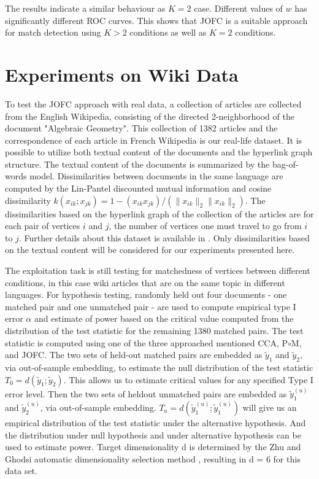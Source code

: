 \documentclass[12pt,oneside,final]{thesis}
\begin{document}
The results indicate a similar behaviour as $K=2$ case. Different  values of $w$ has significantly different ROC curves. This shows that JOFC is a suitable approach for match detection using $K>2$ conditions as well as $K=2$ conditions.


\section{Experiments on Wiki Data}
To test the JOFC approach with real data, a collection of articles are collected from the English Wikipedia, consisting of the
 directed 2-neighborhood of the document "Algebraic Geometry". 
   This  collection of 1382 articles and the correspondence of each article in French 
Wikipedia is our real-life dataset. It is possible to utilize both textual content of the documents and the hyperlink graph structure. The textual content of the documents is summarized by the bag-of-words model. Dissimilarities between documents  in the same language are computed by the Lin-Pantel discounted mutual information \cite{LinPantel,PantelLin}
 and cosine dissimilarity $k(x_{ik}; x_{jk}) = 1 - (x_{ik} x_{jk})/(\|x_{ik}\|_2\|x_{ik}\|_2)$. 
 The dissimilarities based on the hyperlink graph of the collection of the articles are 
 for each pair of vertices $i$ and $j$, the number of vertices one must travel to go from $i$ to $j$.  Further details about this dataset is available in \cite{Zhiliang_disparate}.     
Only  dissimilarities based on the textual content will be considered for our experiments presented here.
   
The exploitation task is still testing for matchedness of vertices between different conditions, in this case wiki articles that are on the same topic  in  different languages.
For hypothesis testing,   randomly held out four documents - one matched pair and one unmatched pair
 -  are used to compute empirical type I error $\alpha$ and estimate of power based on the critical value computed
  from the distribution of the test statistic for the remaining 1380 matched pairs. 
The test statistic is computed using one of the three approached mentioned  CCA, P$\circ$M, and JOFC. 
The two sets of held-out matched pairs are embedded as $\tilde{y}_1$ and $\tilde{y}_2$, via out-of-sample
embedding, to estimate the null distribution of the test statistic $T_0 = d(\tilde{y}_1; \tilde{y}_2)$. This allows
us to estimate critical values for any specified Type I error level. 
Then the two sets of heldout unmatched pairs are embedded as $\tilde{y}_1^{(u)}$ and $\tilde{y}_2^{(u)}$, via out-of-sample embedding. 
$T_{a} = d(\tilde{y}_1^{(u)}; \tilde{y}_1^{(u)})$ will give us an empirical distribution of the test statistic  under the alternative hypothesis. 
And the distribution under null hypothesis and under alternative hypothesis can be used to estimate power.
Target dimensionality d is determined by the Zhu and Ghodsi  automatic dimensionality selection
method \cite{ZhuGhodsi}, resulting in d = 6 for this data set.
\end{document}

